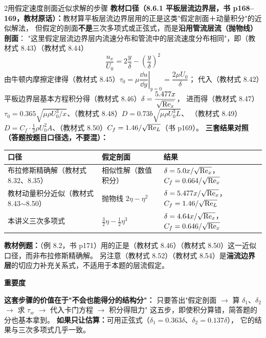 \begin{kaodian}{2}{用假定速度剖面近似求解的步骤}
\textbf{教材口径（8.6.1 平板层流边界层，书 p168--169，教材原话）：}教材算平板层流边界层用的正是这类"假定剖面＋动量积分"的近似解法，
但假定的剖面\textbf{不是}三次多项式或正弦式，而是\textbf{沿用管流层流（抛物线）剖面}：
"这里假定层流边界层内流速分布和管流中的层流速度分布相同"，即（教材式 8.43）（教材式 8.44）
\[ \frac{u_x}{U_0}=2\frac{y}{\delta}-\left(\frac{y}{\delta}\right)^{2} \]
由牛顿内摩擦定律得（教材式 8.45）$\tau_0=\mu\left.\dfrac{\dd u}{\dd y}\right|_{y=0}=\dfrac{2\mu U_0}{\delta}$；
代入（教材式 8.42）平板边界层基本方程积分得（教材式 8.46）$\delta=\dfrac{5.477x}{\sqrt{\mathrm{Re}_x}}$，
进而得（教材式 8.47）$\tau_0=0.365\sqrt{\mu\rho U_0^3/x}$、（教材式 8.48）$D=0.73b\sqrt{\mu\rho U_0^3L}$、
（教材式 8.49）$D=C_f\cdot\frac12\rho U_0^2A$、（教材式 8.50）$C_f=1.46/\sqrt{\mathrm{Re}_L}$（书 p169）。
\textbf{三套结果对照（答题按题目口径选，不要混）：}
\begin{center}
\begin{tabularx}{\textwidth}{@{}lXX@{}}
\toprule
口径 & 假定剖面 & 结果 \\
\midrule
布拉修斯精确解（教材式 8.32、8.35） & 相似性解（数值积分） & $\delta=5.0x/\sqrt{\mathrm{Re}_x}$，$C_f=0.664/\sqrt{\mathrm{Re}_x}$ \\
教材动量积分近似（教材式 8.43$\sim$8.50） & 抛物线 $2\eta-\eta^2$ & $\delta=5.477x/\sqrt{\mathrm{Re}_x}$，$C_f=1.46/\sqrt{\mathrm{Re}_L}$ \\
本讲义三次多项式 & $\frac32\eta-\frac12\eta^3$ & $\delta=4.64x/\sqrt{\mathrm{Re}_x}$，$C_f=0.646/\sqrt{\mathrm{Re}_x}$ \\
\bottomrule
\end{tabularx}
\end{center}
\textbf{教材例题：}（例 8.2，书 p171）用的正是（教材式 8.46）（教材式 8.50）这一近似口径，而非布拉修斯精确解。
另注意（教材式 8.52）（教材式 8.54）是\textbf{湍流边界层}的切应力补充关系式，不适用于本题的层流假定。

\textbf{重要度 }\quad{}\quad{}

\begin{banfa}
\textbf{这套步骤的价值在于"不会也能得分的结构分"：}
只要答出"假定剖面 $\to$ 算 $\delta_1$、$\delta_2$ $\to$ 求 $\tau_w$ $\to$ 代入卡门方程 $\to$ 积分得阻力"
这五步，即使积分算错，简答题的分也基本拿到。
\textbf{如果只让估算：}可用正弦式（$\delta_1=0.363\delta$、$\delta_2=0.137\delta$），
它的结果与三次多项式几乎一致。
\end{banfa}
\end{kaodian}

